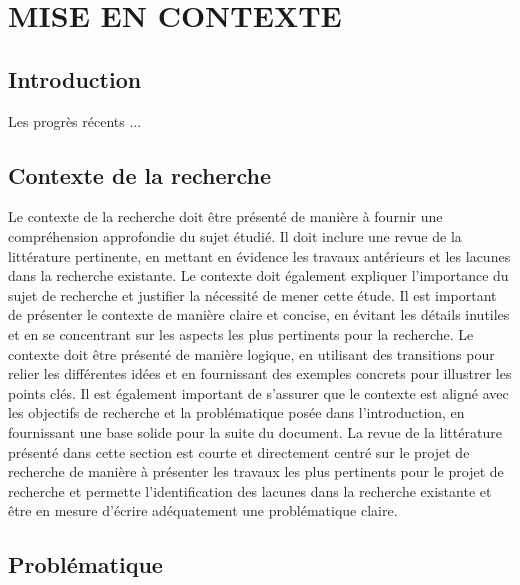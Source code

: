 \chapter{MISE EN CONTEXTE}
\label{chap:chap_1}
\listoftodos[Notes]%

\section*{Introduction}

Les progrès récents ...

\section{Contexte de la recherche}
Le contexte de la recherche doit être présenté de manière à fournir une compréhension approfondie du sujet étudié. Il doit inclure une revue de la littérature pertinente, en mettant en évidence les travaux antérieurs et les lacunes dans la recherche existante. Le contexte doit également expliquer l'importance du sujet de recherche et justifier la nécessité de mener cette étude. Il est important de présenter le contexte de manière claire et concise, en évitant les détails inutiles et en se concentrant sur les aspects les plus pertinents pour la recherche. Le contexte doit être présenté de manière logique, en utilisant des transitions pour relier les différentes idées et en fournissant des exemples concrets pour illustrer les points clés. Il est également important de s'assurer que le contexte est aligné avec les objectifs de recherche et la problématique posée dans l'introduction, en fournissant une base solide pour la suite du document.
La revue de la littérature présenté dans cette section est courte et directement centré sur le projet de recherche de manière à présenter les travaux les plus pertinents pour le projet de recherche et permette l'identification des lacunes dans la recherche existante et être en mesure d'écrire adéquatement une problématique claire.

\section{Problématique}

